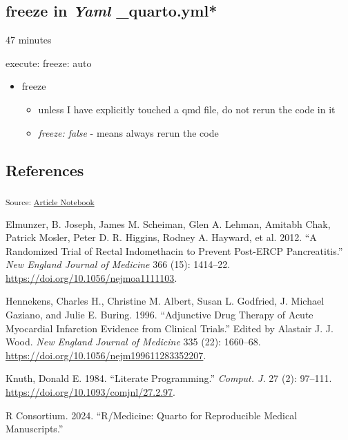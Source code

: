 \documentclass[
  letterpaper,
  DIV=11,
  numbers=noendperiod]{scrartcl}
\providecommand{\tightlist}{%
  \setlength{\itemsep}{0pt}\setlength{\parskip}{0pt}}\usepackage{longtable,booktabs,array}
\newlength{\cslhangindent}
\newenvironment{CSLReferences}[2] %
 {\begin{list}{}{%
  \setlength{\itemindent}{0pt}
  \setlength{\leftmargin}{0pt}
  \setlength{\parsep}{0pt}
  \ifodd #1
   \setlength{\leftmargin}{\cslhangindent}
   \setlength{\itemindent}{-1\cslhangindent}
  \fi
  \setlength{\itemsep}{#2\baselineskip}}}
 {\end{list}}
\begin{document}
\subsection{\texorpdfstring{freeze in \emph{Yaml}
\_quarto.yml*}{freeze in Yaml \_quarto.yml*}}\label{freeze-in-yaml-_quarto.yml}

47 minutes

execute: freeze: auto

\begin{itemize}
\tightlist
\item
  freeze

  \begin{itemize}
  \tightlist
  \item
    unless I have explicitly touched a qmd file, do not rerun the code
    in it
  \item
    \emph{freeze: false} - means always rerun the code
  \end{itemize}
\end{itemize}

\subsection{References}\label{references}

\textsubscript{Source:
\href{https://rccline.github.io/quarto-manuscript01/index.qmd.html}{Article
Notebook}}

\label{refs}
\begin{CSLReferences}{1}{0}
Elmunzer, B. Joseph, James M. Scheiman, Glen A. Lehman, Amitabh Chak,
Patrick Mosler, Peter D. R. Higgins, Rodney A. Hayward, et al. 2012.
{``A Randomized Trial of Rectal Indomethacin to Prevent Post-ERCP
Pancreatitis.''} \emph{New England Journal of Medicine} 366 (15):
1414--22. \url{https://doi.org/10.1056/nejmoa1111103}.

Hennekens, Charles H., Christine M. Albert, Susan L. Godfried, J.
Michael Gaziano, and Julie E. Buring. 1996. {``Adjunctive Drug Therapy
of Acute Myocardial Infarction {\textemdash} Evidence from Clinical
Trials.''} Edited by Alastair J. J. Wood. \emph{New England Journal of
Medicine} 335 (22): 1660--68.
\url{https://doi.org/10.1056/nejm199611283352207}.

Knuth, Donald E. 1984. {``Literate Programming.''} \emph{Comput. J.} 27
(2): 97--111. \url{https://doi.org/10.1093/comjnl/27.2.97}.

R Consortium. 2024. {``R/{Medicine}: {Quarto} for {Reproducible Medical
Manuscripts}.''}

\end{CSLReferences}
\end{document}
